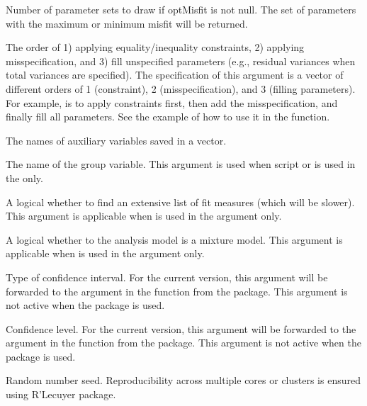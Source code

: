 \documentclass[a4paper]{book}
\begin{document}
\begin{Arguments}
\begin{ldescription}
\item[\code{optDraws}]  
Number of parameter sets to draw if optMisfit is not null. The set of parameters with the maximum or minimum misfit will be returned.

\item[\code{createOrder}] 
The order of 1) applying equality/inequality constraints, 2) applying misspecification, and 3) fill unspecified parameters (e.g., residual variances when total variances are specified). The specification of this argument is a vector of different orders of 1 (constraint), 2 (misspecification), and 3 (filling parameters). For example,  is to apply constraints first, then add the misspecification, and finally fill all parameters. See the example of how to use it in the  function.

\item[\code{aux}] 
The names of auxiliary variables saved in a vector.

\item[\code{group}] 
The name of the group variable. This argument is used when  script or  is used in the  only.

\item[\code{mxFit}] 
A logical whether to find an extensive list of fit measures (which will be slower). This argument is applicable when  is used in the  argument only.

\item[\code{mxMixture}] 
A logical whether to the analysis model is a mixture model. This argument is applicable when  is used in the  argument only.

\item[\code{citype}] 
Type of confidence interval. For the current version, this argument will be forwarded to the  argument in the   function from the  package. This argument is not active when the  package is used.

\item[\code{cilevel}] 
Confidence level. For the current version, this argument will be forwarded to the  argument in the   function from the  package. This argument is not active when the  package is used.

\item[\code{seed}]  
Random number seed. Reproducibility across multiple cores or clusters is ensured using R'Lecuyer package.


\end{ldescription}
\end{Arguments}
\end{document}
